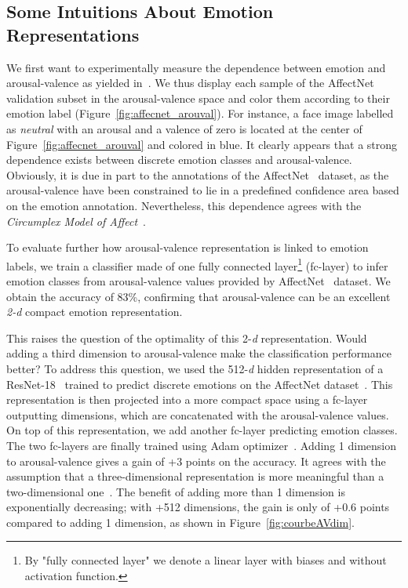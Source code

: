 \documentclass{bmvc2k}
\begin{document}
\subsection{Some Intuitions About Emotion Representations}
\label{subsec:preliminary_study}

We first want to experimentally measure the dependence between emotion and arousal-valence as yielded in~\cite{russell_circumplex_1980}. We thus display each sample of the AffectNet~\cite{mollahosseini_affectnet:_2017} validation subset in the arousal-valence space and color them according to their emotion label (Figure~\ref{fig:affecnet_arouval}). For instance, a face image labelled as \textit{neutral} with an arousal and a valence of zero is located at the center of Figure~\ref{fig:affecnet_arouval} and colored in blue. It clearly appears that a strong dependence exists between discrete emotion classes and arousal-valence. Obviously, it is due in part to the annotations of the AffectNet~\cite{mollahosseini_affectnet:_2017} dataset, as the arousal-valence have been constrained to lie in a predefined confidence area based on the emotion annotation. Nevertheless, this dependence agrees with the \textit{Circumplex Model of Affect}~\cite{russell_circumplex_1980}.

To evaluate further how arousal-valence representation is linked to emotion labels, we train a classifier made of one  fully connected layer\footnote{By "fully connected layer" we denote a linear layer with biases and without activation function.} (fc-layer) to infer emotion classes from arousal-valence values provided by AffectNet~\cite{mollahosseini_affectnet:_2017} dataset. We obtain the accuracy of 83\%, confirming that arousal-valence can be an excellent \textit{2-d} compact emotion representation.  

This raises the question of the optimality of this 2-\textit{d} representation. Would adding a third dimension to arousal-valence make the classification performance better? To address this question, we used the 512-\textit{d} hidden representation of a ResNet-18~\cite{he_deep_2015} trained to predict  discrete emotions on the AffectNet dataset~\cite{mollahosseini_affectnet:_2017}. This representation is then projected into a more compact space using a fc-layer outputting  dimensions, which are concatenated with the arousal-valence values. On top of this representation, we add another fc-layer predicting emotion classes. The two fc-layers are finally trained using Adam optimizer~\cite{kingma2014adam}.
Adding 1 dimension to arousal-valence gives a gain of +3 points on the accuracy. It agrees with the assumption that a three-dimensional representation is more meaningful than a two-dimensional one~\cite{mehrabian1996pleasure}. The benefit of adding more than 1 dimension is exponentially decreasing; with +512 dimensions, the gain is only of +0.6 points compared to adding 1 dimension, as shown in Figure~\ref{fig:courbeAVdim}.
\end{document}
